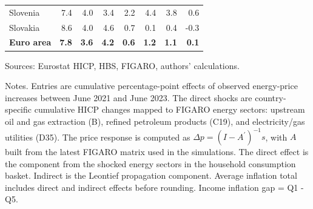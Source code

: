 \begin{table}[H]
\begin{tabular}{lrrrrrrr}
 \\
Slovenia & 7.4 & 4.0 & 3.4 & 2.2 & 4.4 & 3.8 & 0.6
 \\
Slovakia & 8.6 & 4.0 & 4.6 & 0.7 & 0.1 & 0.4 & -0.3
 \\
\midrule
\textbf{Euro area} & \textbf{7.8} & \textbf{3.6} & \textbf{4.2} & \textbf{0.6} & \textbf{1.2} & \textbf{1.1} & \textbf{0.1}
 \\
\bottomrule
\end{tabular}
\par\vspace{0.35em}\footnotesize\noindent Sources: Eurostat HICP, HBS, FIGARO, authors' calculations.
\par\vspace{0.25em}\footnotesize\noindent Notes. Entries are cumulative percentage-point effects of observed energy-price increases between June 2021 and June 2023. The direct shocks are country-specific cumulative HICP changes mapped to FIGARO energy sectors: upstream oil and gas extraction (B), refined petroleum products (C19), and electricity/gas utilities (D35). The price response is computed as $\Delta p = (I - A^{\prime})^{-1}s$, with $A$ built from the latest FIGARO matrix used in the simulations. The direct effect is the component from the shocked energy sectors in the household consumption basket. Indirect is the Leontief propagation component. Average inflation total includes direct and indirect effects before rounding. Income inflation gap = Q1 - Q5.
\end{table}
\vspace{0.6em}
